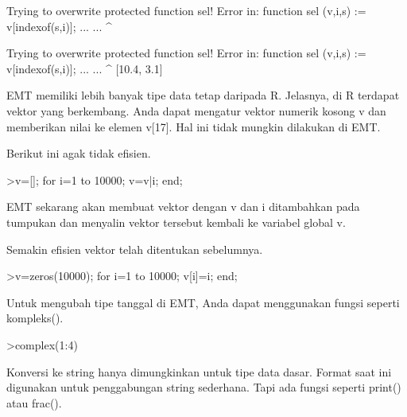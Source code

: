 \documentclass[a4paper,10pt]{article}
\begin{document}
\begin{eulernotebook}
\begin{eulercomment}
\begin{eulercomment}
\begin{eulercomment}
\begin{eulercomment}
\begin{eulercomment}
\begin{eulercomment}
\begin{euleroutput}
  Trying to overwrite protected function sel!
  Error in:
  function sel (v,i,s) := v[indexof(s,i)]; ... ...
               ^
  
  Trying to overwrite protected function sel!
  Error in:
  function sel (v,i,s) := v[indexof(s,i)]; ... ...
               ^
  [10.4,  3.1]
\end{euleroutput}
\begin{eulercomment}
EMT memiliki lebih banyak tipe data tetap daripada R. Jelasnya, di R
terdapat vektor yang berkembang. Anda dapat mengatur vektor numerik
kosong v dan memberikan nilai ke elemen v[17]. Hal ini tidak mungkin
dilakukan di EMT.

Berikut ini agak tidak efisien.
\end{eulercomment}
\begin{eulerprompt}
>v=[]; for i=1 to 10000; v=v|i; end;
\end{eulerprompt}
\begin{eulercomment}
EMT sekarang akan membuat vektor dengan v dan i ditambahkan pada
tumpukan dan menyalin vektor tersebut kembali ke variabel global v.

Semakin efisien vektor telah ditentukan sebelumnya.
\end{eulercomment}
\begin{eulerprompt}
>v=zeros(10000); for i=1 to 10000; v[i]=i; end;
\end{eulerprompt}
\begin{eulercomment}
Untuk mengubah tipe tanggal di EMT, Anda dapat menggunakan fungsi
seperti kompleks().
\end{eulercomment}
\begin{eulerprompt}
>complex(1:4)
\end{eulerprompt}
\begin{euleroutput}
  [ 1+0i ,  2+0i ,  3+0i ,  4+0i  ]
\end{euleroutput}
\begin{eulercomment}
Konversi ke string hanya dimungkinkan untuk tipe data dasar. Format
saat ini digunakan untuk penggabungan string sederhana. Tapi ada
fungsi seperti print() atau frac().


\end{eulercomment}
\end{eulercomment}
\end{eulercomment}
\end{eulercomment}
\end{eulercomment}
\end{eulercomment}
\end{eulercomment}
\end{eulernotebook}
\end{document}
